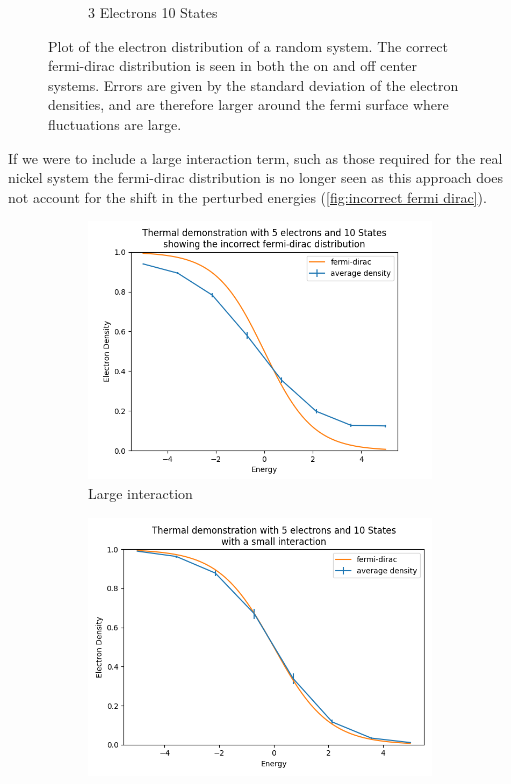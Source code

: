 \begin{figure}[htbp]
\begin{subfigure}{0.45\linewidth}
        \caption{3 Electrons 10 States}
    \end{subfigure}
    \caption{Plot of the electron distribution of
        a random system. The
        correct fermi-dirac distribution is seen in both the on and
        off center systems. Errors are given by the standard
        deviation of the electron densities, and are
        therefore larger around the fermi surface where fluctuations are
        large.}\label{fig:correct fermi dirac}
\end{figure}
If we were to include
a large interaction term, such
as those required for the
real nickel system the
fermi-dirac distribution
is no longer seen as this approach
does not account for the
shift in the perturbed
energies (\cref{fig:incorrect fermi dirac}).
\begin{figure}[htbp]
    \centering
    \begin{subfigure}{0.45\linewidth}
        \centering
        \includegraphics[width =0.9 \linewidth]{Figures/Simulation/Plot of incorrect fermi dirac distribution on center.png}
        \caption{Large interaction}
    \end{subfigure}
    \hfill
    \begin{subfigure}{0.45\linewidth}
        \centering
        \includegraphics[width = 0.9\linewidth]{Figures/Simulation/Plot of incorrect fermi dirac distribution on center small interaction.png}

\end{subfigure}
\end{figure}
